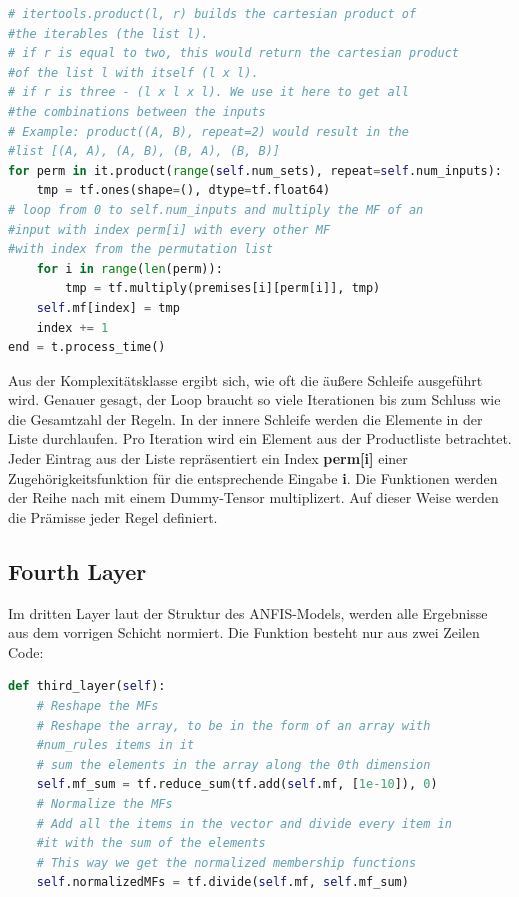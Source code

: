 \begin{lstlisting}[language=Python]
# itertools.product(l, r) builds the cartesian product of 
#the iterables (the list l).
# if r is equal to two, this would return the cartesian product 
#of the list l with itself (l x l).
# if r is three - (l x l x l). We use it here to get all 
#the combinations between the inputs
# Example: product((A, B), repeat=2) would result in the 
#list [(A, A), (A, B), (B, A), (B, B)]
for perm in it.product(range(self.num_sets), repeat=self.num_inputs):
	tmp = tf.ones(shape=(), dtype=tf.float64)
# loop from 0 to self.num_inputs and multiply the MF of an 
#input with index perm[i] with every other MF 
#with index from the permutation list
	for i in range(len(perm)):
		tmp = tf.multiply(premises[i][perm[i]], tmp)
	self.mf[index] = tmp
	index += 1
end = t.process_time()
\end{lstlisting}

Aus der Komplexitätsklasse ergibt sich, wie oft die äußere Schleife ausgeführt wird. Genauer gesagt, der Loop braucht so viele Iterationen bis zum Schluss wie die Gesamtzahl der Regeln. In der innere Schleife werden die Elemente in der Liste durchlaufen. Pro Iteration wird ein Element aus der Productliste betrachtet. Jeder Eintrag aus der Liste repräsentiert ein Index \textbf{perm{[}i{]}} einer Zugehörigkeitsfunktion für die entsprechende Eingabe \textbf{i}. Die Funktionen werden der Reihe nach mit einem Dummy-Tensor multiplizert. Auf dieser Weise werden die Prämisse jeder Regel definiert.

\subsection{Fourth Layer}\label{fourth-layer}

Im dritten Layer laut der Struktur des ANFIS-Models, werden alle Ergebnisse aus dem vorrigen Schicht normiert. Die Funktion besteht nur aus zwei Zeilen Code:
\begin{lstlisting}[language=Python]
def third_layer(self):
	# Reshape the MFs
	# Reshape the array, to be in the form of an array with 
	#num_rules items in it
	# sum the elements in the array along the 0th dimension
	self.mf_sum = tf.reduce_sum(tf.add(self.mf, [1e-10]), 0)
	# Normalize the MFs
	# Add all the items in the vector and divide every item in 
	#it with the sum of the elements
	# This way we get the normalized membership functions
	self.normalizedMFs = tf.divide(self.mf, self.mf_sum)
\end{lstlisting}

